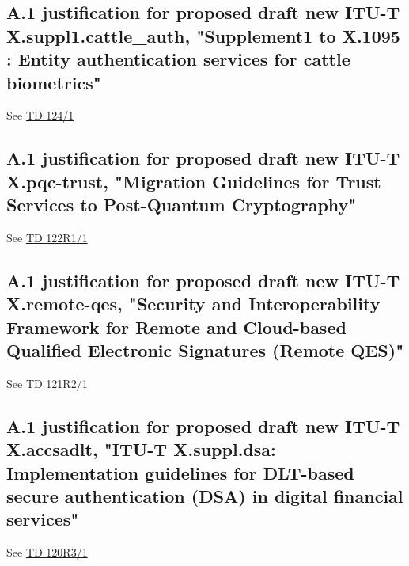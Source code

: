 \newpage

\subsection*{A.1 justification for proposed draft new ITU-T X.suppl1.cattle\_auth, "Supplement1 to X.1095 : Entity authentication services for cattle biometrics"}
See \href{https://www.itu.int/md/meetingdoc.asp?lang=en\&parent=T25-SG17-251203-TD-WP1-0124}{TD 124/1}

\newpage

\subsection*{A.1 justification for proposed draft new ITU-T X.pqc-trust, "Migration Guidelines for Trust Services to Post-Quantum Cryptography"}
See \href{https://www.itu.int/md/meetingdoc.asp?lang=en\&parent=T25-SG17-251203-TD-WP1-0122}{TD 122R1/1}

\newpage

\subsection*{A.1 justification for proposed draft new ITU-T X.remote-qes, "Security and Interoperability Framework for Remote and Cloud-based Qualified Electronic Signatures (Remote QES)"}
See \href{https://www.itu.int/md/meetingdoc.asp?lang=en\&parent=T25-SG17-251203-TD-WP1-0121}{TD 121R2/1}

\newpage

\subsection*{A.1 justification for proposed draft new ITU-T X.accsadlt, "ITU-T X.suppl.dsa: Implementation guidelines for DLT-based secure authentication (DSA) in digital financial services"}
See \href{https://www.itu.int/md/meetingdoc.asp?lang=en\&parent=T25-SG17-251203-TD-WP1-0120}{TD 120R3/1}

\newpage
